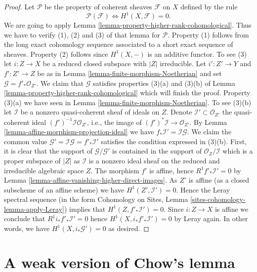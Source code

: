 \documentclass{stacks-project}
\theoremstyle{plain}
\theoremstyle{definition}
\theoremstyle{remark}
\numberwithin{equation}{subsection}
\begin{document}
\begin{proof}
\medskip\noindent
Let $\mathcal{P}$ be the property of coherent sheaves
$\mathcal{F}$ on $X$ defined by the rule
$$
\mathcal{P}(\mathcal{F}) \Leftrightarrow H^1(X, \mathcal{F}) = 0.
$$
We are going to apply Lemma \ref{lemma-property-higher-rank-cohomological}.
Thus we have to verify (1), (2) and (3) of that lemma for $\mathcal{P}$.
Property (1) follows from the long exact cohomology sequence associated
to a short exact sequence of sheaves. Property (2) follows since
$H^1(X, -)$ is an additive functor. To see (3) let $i : Z \to X$ be
a reduced closed subspace with $|Z|$ irreducible. Let $i' : Z' \to Y$
and $f' : Z' \to Z$ be as in Lemma \ref{lemma-finite-morphism-Noetherian}
and set $\mathcal{G} = f'_*\mathcal{O}_{Z'}$. We claim that
$\mathcal{G}$ satisfies properties (3)(a) and (3)(b) of
Lemma \ref{lemma-property-higher-rank-cohomological}
which will finish the proof. Property (3)(a) we have seen in
Lemma \ref{lemma-finite-morphism-Noetherian}. To see (3)(b) let
$\mathcal{I}$ be a nonzero quasi-coherent sheaf of ideals on $Z$.
Denote $\mathcal{I}' \subset \mathcal{O}_{Z'}$ the quasi-coherent
ideal $(f')^{-1}\mathcal{I} \mathcal{O}_{Z'}$, i.e., the
image of $(f')^*\mathcal{I} \to \mathcal{O}_{Z'}$.
By Lemma \ref{lemma-affine-morphism-projection-ideal} we have
$f_*\mathcal{I}' = \mathcal{I} \mathcal{G}$.
We claim the common value
$\mathcal{G}' = \mathcal{I} \mathcal{G} = f'_*\mathcal{I}'$
satisfies the condition expressed in (3)(b).
First, it is clear that the support of $\mathcal{G}/\mathcal{G}'$
is contained in the support of $\mathcal{O}_Z/\mathcal{I}$
which is a proper subspace of $|Z|$ as $\mathcal{I}$ is a
nonzero ideal sheaf on the reduced and irreducible algebraic space $Z$.
The morphism $f'$ is affine, hence $R^1f'_*\mathcal{I}' = 0$ by
Lemma \ref{lemma-affine-vanishing-higher-direct-images}.
As $Z'$ is affine (as a closed subscheme of an affine scheme)
we have $H^1(Z', \mathcal{I}') = 0$. Hence the Leray
spectral sequence (in the form
Cohomology on Sites, Lemma \ref{sites-cohomology-lemma-apply-Leray})
implies that $H^1(Z, f'_*\mathcal{I}') = 0$.
Since $i : Z \to X$ is affine we conclude that
$R^1i_*f'_*\mathcal{I}' = 0$ hence $H^1(X, i_*f'_*\mathcal{I}') = 0$
by Leray again. In other words, we have $H^1(X, i_*\mathcal{G}') = 0$
as desired.
\end{proof}








\section{A weak version of Chow's lemma}
\label{section-weak-chow}
\end{document}
